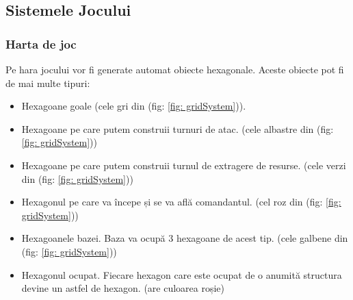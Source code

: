 \documentclass[12pt, a4paper]{article}
\begin{document}
	



	

	
	
	
	
	
	\subsection{Sistemele Jocului}
	
	
	
	
	
	\subsubsection{Harta de joc}
	
	Pe hara jocului vor fi generate automat obiecte hexagonale. Aceste obiecte pot fi de mai multe tipuri:
	\begin{itemize}
		\item Hexagoane goale (cele gri din (fig: \ref{fig: gridSystem})).
		\item Hexagoane pe care putem construii turnuri de atac. (cele albastre din (fig: \ref{fig: gridSystem}))
		\item Hexagoane pe care putem construii turnul de extragere de resurse. (cele verzi din (fig: \ref{fig: gridSystem}))
		\item Hexagonul pe care va începe și se va află comandantul. (cel roz din (fig: \ref{fig: gridSystem}))
		\item Hexagoanele bazei. Baza va ocupă 3 hexagoane de acest tip. (cele galbene din (fig: \ref{fig: gridSystem}))
		\item Hexagonul ocupat. Fiecare hexagon care este ocupat de o anumită structura devine un astfel de hexagon. (are culoarea roșie)
	\end{itemize}
	
\end{document}

